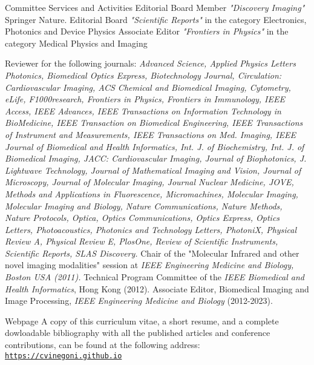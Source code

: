\documentclass{resume}
\begin{document}
%
%
\begin{category}{Committee Services and Activities}
\citembullet 
Editorial Board Member {\it "Discovery Imaging"} Springer Nature.
\citembullet 
Editorial Board {\it "Scientific Reports"} in the category Electronics, Photonics and Device Physics
\citembullet 
Associate Editor {\it "Frontiers in Physics"} in the category Medical Physics and Imaging

\citembullet 
Reviewer for the following journals: {\it Advanced Science, Applied Physics Letters Photonics, Biomedical Optics Express, Biotechnology Journal, Circulation: Cardiovascular Imaging, ACS Chemical and Biomedical Imaging, Cytometry, eLife, F1000research, Frontiers in Physics, Frontiers in Immunology, IEEE Access, IEEE Advances, IEEE Transactions on Information Technology in BioMedicine,  IEEE Transaction on Biomedical Engineering, IEEE Transactions of Instrument and Measurements, IEEE Transactions on Med. Imaging,  IEEE Journal of Biomedical and Health Informatics, Int. J. of Biochemistry, Int. J. of Biomedical Imaging, JACC: Cardiovascular Imaging, Journal of Biophotonics, J. Lightwave Technology, Journal of Mathematical Imaging and Vision, Journal of Microscopy, Journal of Molecular Imaging, Journal Nuclear Medicine, JOVE,  Methods and Applications in Fluorescence, Micromachines, Molecular Imaging, Molecular Imaging and Biology, Nature Communications, Nature Methods, Nature Protocols, Optica, Optics Communications, Optics Express, Optics Letters, Photoacoustics, Photonics and Technology Letters, PhotoniX, Physical Review A, Physical Review E, PlosOne, Review of Scientific Instruments, Scientific Reports, SLAS Discovery.}
\citembullet 
Chair of the "Molecular Infrared and other novel imaging modalities" session at {\it IEEE Engineering Medicine and Biology, Boston USA (2011).}
\citembullet 
Technical Program Committee of the {\it IEEE Biomedical and Health Informatics}, Hong Kong (2012).
\citembullet 
Associate Editor, Biomedical Imaging and Image Processing, {\it IEEE Engineering Medicine and Biology} (2012-2023).
\end{category}

\begin{category}{Webpage}
 \citemnobullet 
A copy of this curriculum vitae, a short
resume, and a complete dowloadable bibliography with all the
published articles and conference contributions, can be found at the
following address:
\newline
    \mbox{\small\tt \url{https://cvinegoni.github.io}}
\end{category}
\end{document}
